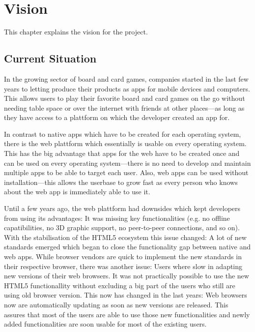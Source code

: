 \chapter{Vision}

This chapter explains the vision for the project.

\section{Current Situation}

In the growing sector of board and card games, companies started in the last few
years to letting produce their products as apps for mobile devices and
computers. This allows users to play their favorite board and card games on the
go without needing table space or over the internet with friends at other
places---as long as they have access to a plattform on which the developer
created an app for.

In contrast to native apps which have to be created for each operating system,
there is the web plattform which essentially is usable on every operating
system. This has the big advantage that apps for the web have to be created once
and can be used on every operating system---there is no need to develop and
maintain multiple apps to be able to target each user. Also, web apps can be
used without installation---this allows the userbase to grow fast as every
person who knows about the web app is immediately able to use it.

Until a few years ago, the web plattform had downsides which kept developers
from using its advantages: It was missing key functionalities (e.g.
no offline capatibilities, no 3D graphic support, no \gls{peer-to-peer}
connections, and so on). With the stabilisation of the \gls{HTML5} ecosystem
this issue changed: A lot of new standards emerged which began to close the
functionality gap between native and web apps. While browser vendors are quick
to implement the new standards in their respective browser, there was another
issue: Users where slow in adapting new versions of their web browsers. It was
not practically possible to use the new \gls{HTML5} functionallity without
excluding a big part of the users who still are using old browser version. This
now has changed in the last years: Web browsers now are automatically updating
as soon as new versions are released. This assures that most of the users are
able to use those new functionalities and newly added functionalities are soon
usable for most of the existing users.

